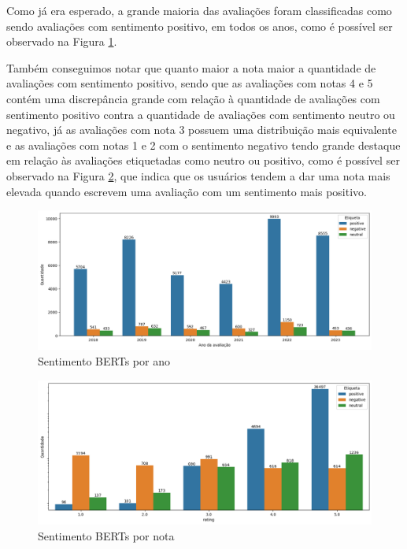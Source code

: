Como já era esperado, a grande maioria das avaliações foram classificadas como sendo avaliações com sentimento positivo, em todos os anos, como é possível ser observado na Figura \ref{img:sentimento_timechart_bert}.

Também conseguimos notar que quanto maior a nota maior a quantidade de avaliações com sentimento positivo, sendo que as avaliações com notas 4 e 5 contém uma discrepância grande com relação à quantidade de avaliações com sentimento positivo contra a quantidade de avaliações com sentimento neutro ou negativo, já as avaliações com nota 3 possuem uma distribuição mais equivalente e as avaliações com notas 1 e 2 com o sentimento negativo tendo grande destaque em relação às avaliações etiquetadas como neutro ou positivo, como é possível ser observado na Figura \ref{img:sentimento_nota_bert}, que indica que os usuários tendem a dar uma nota mais elevada quando escrevem uma avaliação com um sentimento mais positivo.

\begin{figure}
	\centering
	\includegraphics[width=1\textwidth]{figs/bert/sentimento_ano.png}
	\caption{Sentimento BERTs por ano}
	\label{img:sentimento_timechart_bert}
\end{figure}

\begin{figure}
	\centering
	\includegraphics[width=1\textwidth]{figs/bert/sentimento_nota.png}
	\caption{Sentimento BERTs por nota}
	\label{img:sentimento_nota_bert}
\end{figure}

